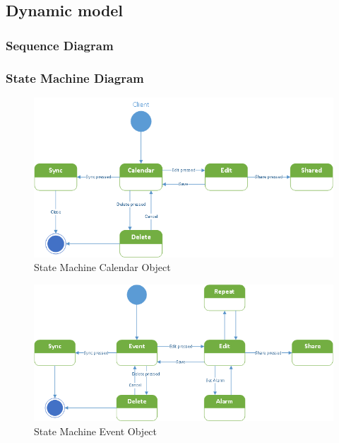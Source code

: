 \subsection*{Dynamic model}

\subsubsection*{Sequence Diagram}

\newpage
\subsubsection*{State Machine Diagram}

\begin{figure}[ht!]
\centering
\includegraphics[width=160mm]{calendar.png}
\caption{State Machine Calendar Object  \label{overflow}}
\end{figure}

\begin{figure}[ht!]
\centering
\includegraphics[width=160mm]{event.png}
\caption{State Machine Event Object \label{overflow}}
\end{figure}

